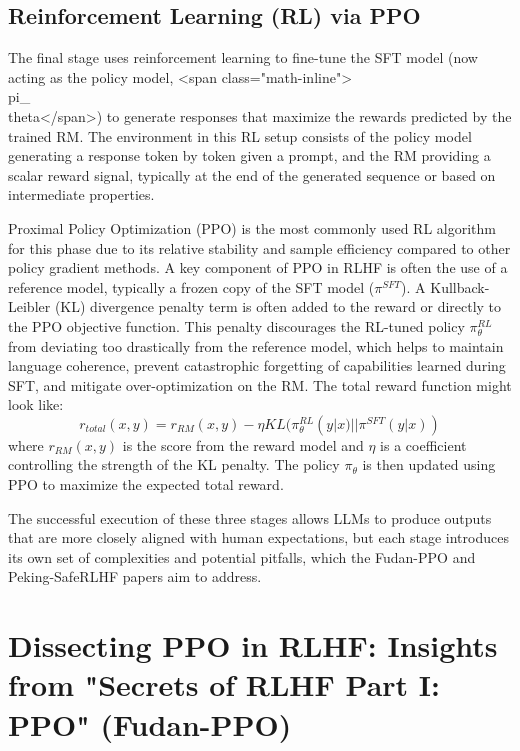 \documentclass[10pt,journal,compsoc]{IEEEtran} %
\begin{document}
\subsection{Reinforcement Learning (RL) via PPO}
The final stage uses reinforcement learning to fine-tune the SFT model (now acting as the policy model, <span class="math-inline">\\pi\_\\theta</span>) to generate responses that maximize the rewards predicted by the trained RM. The environment in this RL setup consists of the policy model generating a response token by token given a prompt, and the RM providing a scalar reward signal, typically at the end of the generated sequence or based on intermediate properties.

Proximal Policy Optimization (PPO) \cite{Zheng2023PPO, Dai2023SafeRLHF} is the most commonly used RL algorithm for this phase due to its relative stability and sample efficiency compared to other policy gradient methods. A key component of PPO in RLHF is often the use of a reference model, typically a frozen copy of the SFT model ($\pi^{SFT}$). A Kullback-Leibler (KL) divergence penalty term is often added to the reward or directly to the PPO objective function. This penalty discourages the RL-tuned policy $\pi_\theta^{RL}$ from deviating too drastically from the reference model, which helps to maintain language coherence, prevent catastrophic forgetting of capabilities learned during SFT, and mitigate over-optimization on the RM. \cite{Zheng2023PPO} The total reward function might look like:
$$ r_{total}(x,y) = r_{RM}(x,y) - \eta KL(\pi_\theta^{RL}(y|x) |
| \pi^{SFT}(y|x)) $$
where $r_{RM}(x,y)$ is the score from the reward model and $\eta$ is a coefficient controlling the strength of the KL penalty. The policy $\pi_\theta$ is then updated using PPO to maximize the expected total reward.

The successful execution of these three stages allows LLMs to produce outputs that are more closely aligned with human expectations, but each stage introduces its own set of complexities and potential pitfalls, which the Fudan-PPO and Peking-SafeRLHF papers aim to address.

\section{Dissecting PPO in RLHF: Insights from "Secrets of RLHF Part I: PPO" (Fudan-PPO)}
\label{sec:fudan_ppo}
\end{document}
